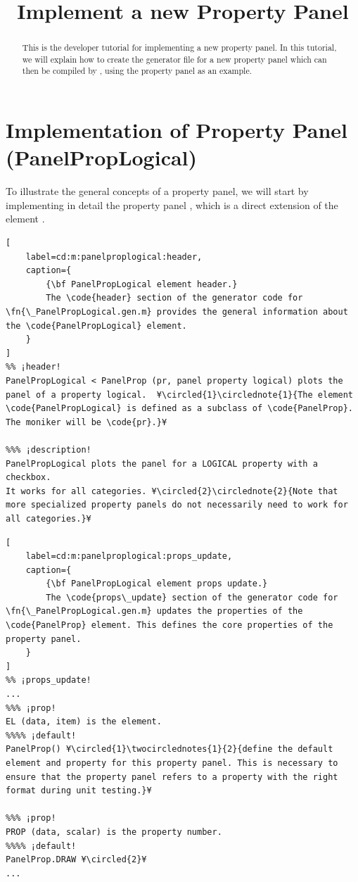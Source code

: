 \documentclass{tufte-handout}
\title{Implement a new Property Panel}
\begin{document}
\maketitle

\begin{abstract}
\noindent
This is the developer tutorial for implementing a new property panel. 
In this tutorial, we will explain how to create the generator file  for a new property panel which can then be compiled by , using the property panel  as an example.
\end{abstract}

\tableofcontents

\clearpage
\section{Implementation of Property Panel (PanelPropLogical)}


To illustrate the general concepts of a property panel, we will start by implementing in detail the property panel , which is a direct extension of the element .

\begin{lstlisting}[
	label=cd:m:panelproplogical:header,
	caption={
		{\bf PanelPropLogical element header.}
		The \code{header} section of the generator code for \fn{\_PanelPropLogical.gen.m} provides the general information about the \code{PanelPropLogical} element.
	}
]
%% ¡header!
PanelPropLogical < PanelProp (pr, panel property logical) plots the panel of a property logical.  ¥\circled{1}\circlednote{1}{The element \code{PanelPropLogical} is defined as a subclass of \code{PanelProp}. The moniker will be \code{pr}.}¥

%%% ¡description!
PanelPropLogical plots the panel for a LOGICAL property with a checkbox.
It works for all categories. ¥\circled{2}\circlednote{2}{Note that more specialized property panels do not necessarily need to work for all categories.}¥

\end{lstlisting}

\begin{lstlisting}[
	label=cd:m:panelproplogical:props_update,
	caption={
		{\bf PanelPropLogical element props update.}
		The \code{props\_update} section of the generator code for \fn{\_PanelPropLogical.gen.m} updates the properties of the \code{PanelProp} element. This defines the core properties of the property panel.
	}
]
%% ¡props_update!
...
%%% ¡prop!
EL (data, item) is the element.
%%%% ¡default!
PanelProp() ¥\circled{1}\twocirclednotes{1}{2}{define the default element and property for this property panel. This is necessary to ensure that the property panel refers to a property with the right format during unit testing.}¥

%%% ¡prop!
PROP (data, scalar) is the property number.
%%%% ¡default!
PanelProp.DRAW ¥\circled{2}¥
...
\end{lstlisting}
\end{document}
